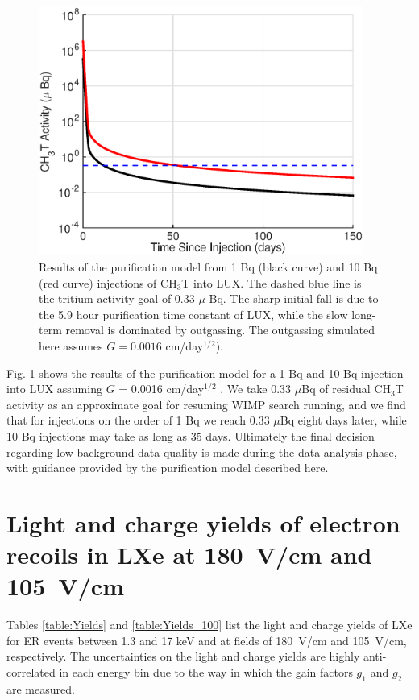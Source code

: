 \begin{figure}[h!]
\includegraphics[width=0.95\textwidth]{fig/LUX_og_lim.eps}
\caption{Results of the purification model from 1 Bq (black curve) and 10 Bq (red curve) injections of CH$_3$T into LUX. The dashed blue line is the tritium activity goal of 0.33 $\mu$ Bq. The sharp initial fall is due to the 5.9 hour purification time constant of LUX, while the slow long-term removal is dominated by outgassing. The outgassing simulated here assumes  $G=0.0016$ cm/day$^{1/2}$).}
\label{fig:tau_var}
\end{figure}

Fig. \ref{fig:tau_var} shows the results of the purification model for a 1 Bq and 10 Bq injection into LUX assuming $G$ = 0.0016 cm/day$^{1/2}$  . We take 0.33 $\mu$Bq of residual CH$_3$T activity as an approximate goal for resuming WIMP search running, and we find that for injections on the order of 1 Bq we reach 0.33 $\mu$Bq eight days later, while 10 Bq injections may take as long as 35 days.  Ultimately the final decision regarding low background data quality is made during the data analysis phase, with guidance provided by the purification model described here.

\section{Light and charge yields of electron recoils in LXe at 180~V/cm and 105~V/cm}
\label{sec:appendix3}

Tables \ref{table:Yields} and \ref{table:Yields_100} list the light and charge yields of LXe for ER events between 1.3 and 17 keV and at fields of 180~V/cm and 105~V/cm, respectively. The uncertainties on the light and charge yields are highly anti-correlated in each energy bin due to the way in which the gain factors $g_1$ and $g_2$ are measured. 

